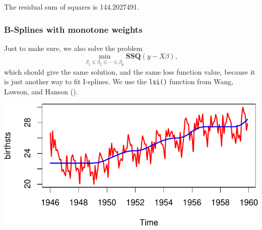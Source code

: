 \documentclass[
  12pt,
  letterpaper,
  DIV=11,
  numbers=noendperiod]{scrreprt}
\newenvironment{Shaded}{\begin{snugshade}}{\end{snugshade}}
\newcommand{\AttributeTok}[1]{\textcolor[rgb]{0.40,0.45,0.13}{#1}}
\newcommand{\ControlFlowTok}[1]{\textcolor[rgb]{0.00,0.23,0.31}{\textbf{#1}}}
\newcommand{\DecValTok}[1]{\textcolor[rgb]{0.68,0.00,0.00}{#1}}
\newcommand{\FunctionTok}[1]{\textcolor[rgb]{0.28,0.35,0.67}{#1}}
\newcommand{\NormalTok}[1]{\textcolor[rgb]{0.00,0.23,0.31}{#1}}
\newcommand{\OtherTok}[1]{\textcolor[rgb]{0.00,0.23,0.31}{#1}}
\newcommand{\SpecialCharTok}[1]{\textcolor[rgb]{0.37,0.37,0.37}{#1}}
\theoremstyle{remark}
\begin{document}
The residual sum of squares is 144.2027491.

\subsubsection{B-Splines with monotone
weights}\label{b-splines-with-monotone-weights}

Just to make sure, we also solve the problem \[
\min_{\beta_1\leq\beta_2\leq\cdots\leq\beta_p}\mathbf{SSQ}(y-X\beta),
\] which should give the same solution, and the same loss function
value, because it is just another way to fit I-splines. We use the
\texttt{lsi()} function from Wang, Lawson, and Hanson
().

\begin{Shaded}
\end{Shaded}

\begin{center}
\includegraphics{splinical_files/figure-pdf/birthsisplinesvaluesplot-1.pdf}
\end{center}
\end{document}

